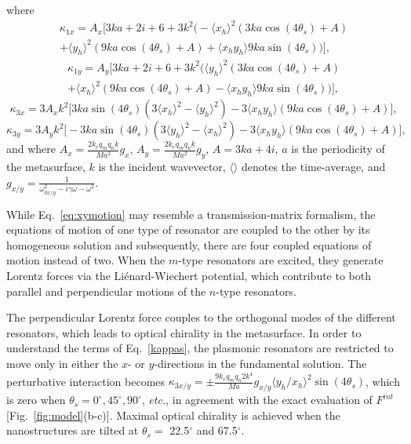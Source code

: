 where
\begin{multline}
\kappa_{1x} =  A_x\bigg[3k a + 2 i + 6+3k^2
\bigg(-  \langle x_{h}\rangle^2 (3ka\cos(4\theta_s)+A) \\ + \langle y_{h}\rangle^2 (9ka\cos(4\theta_s)+A)+\langle x_{h} y_{h}\rangle 9ka \sin(4\theta_s)\bigg)\bigg],
\end{multline}
\begin{multline}
\kappa_{1y} = A_y \bigg[3k a + 2 i + 6+3k^2
\bigg(  \langle y_{h}\rangle^2 (3ka\cos(4\theta_s)+A) \\ + \langle x_{h}\rangle^2 (9ka\cos(4\theta_s)+A)-\langle x_{h} y_{h}\rangle 9ka \sin(4\theta_s)\bigg)\bigg],
\end{multline}
\begin{equation}
\kappa_{3x} = 3A_xk^2
\bigg[ 3ka\sin(4\theta_s)(3\langle x_{h}\rangle^2 - \langle y_{h} \rangle^2)-3\langle x_{h} y_{h}\rangle(9ka\cos(4\theta_s)+A)\bigg],
\end{equation}
\begin{equation}
\kappa_{3y} = 3A_yk^2
\bigg[- 3ka\sin(4\theta_s)(3\langle y_{h}\rangle^2 - \langle x_{h} \rangle^2)-3\langle x_{h} y_{h}\rangle(9ka\cos(4\theta_s)+A)\bigg],
\label{kappas}
\end{equation}
and where $A_x = \frac{2k_eq_mq_nk}{Ma^2}g_{x}$, $A_y = \frac{2k_eq_mq_nk}{Ma^2}g_{y}$, $A=3ka+4i$, $a$ is the periodicity of the metasurface, $k$ is the incident wavevector, $\langle\rangle$ denotes the time-average, and $g_{x/y} =\frac{1}{\omega_{0x/y}^2-i\gamma\omega-\omega^2}$. 
 
While Eq.~\ref{eq:xymotion} may resemble a transmission-matrix formalism, the equations of motion of one type of resonator are coupled to the other by its homogeneous solution and subsequently, there are four coupled equations of motion instead of two. When the $m$-type resonators are excited, they generate Lorentz forces via the Li\'{e}nard-Wiechert potential, which contribute to both parallel and perpendicular motions of the $n$-type resonators.

The perpendicular Lorentz force couples to the orthogonal modes of the different resonators, which leads to optical chirality in the metasurface. In order to understand the terms of Eq.~\ref{kappas}, the plasmonic resonators are restricted to move only in either the $x$- or $y$-directions in the fundamental solution. The perturbative interaction becomes $\kappa_{3x/y} = \pm\frac{9k_eq_mq_n2k^4}{M a}g_{x/y}\langle y_{h}/x_{h} \rangle^2\sin(4\theta_s)$, which is zero when $\theta_s = 0^\circ, 45^\circ, 90^\circ$, \textit{etc.}, in agreement with the exact evaluation of $F^{int}$ [Fig.~\ref{fig:model}(b-c)]. Maximal optical chirality is achieved when the nanostructures are tilted at $\theta_s =$ 22.5$^\circ$ and 67.5$^\circ$. 

